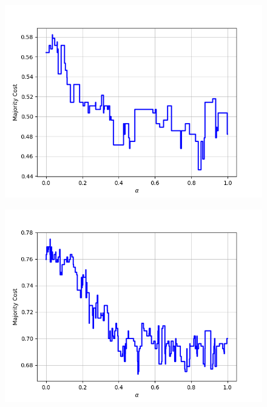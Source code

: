 \begin{figure}[H]
\begin{minipage}{.24\textwidth}
  {\includegraphics[width=\linewidth]{plots/omniglot-intra-ac-cnn/Bengali}}
\end{minipage}
\begin{minipage}{.24\textwidth}
  \centering
  {\includegraphics[width=\linewidth]{plots/omniglot-intra-ac-cnn/Blackfoot_(Canadian_Aboriginal_Syllabics)}}
\end{minipage}
\begin{minipage}{.24\textwidth}
  \centering

\end{minipage}
\end{figure}
